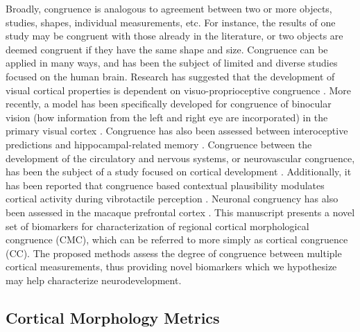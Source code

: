 \documentclass{article}
\begin{document}
Broadly, congruence is analogous to agreement between two or more
objects, studies, shapes, individual measurements, etc. For instance, the
results of one study may be congruent with those already in the literature,
or two objects are deemed congruent if they have the same shape and size.
Congruence can be applied in many ways, and has been the subject of limited
and diverse studies focused on the human brain. Research has suggested that
the development of visual cortical properties is dependent on
visuo-proprioceptive congruence \citep{buisseretChapter22Development1993}.
More recently, a model has been specifically developed for congruence of
binocular vision (how information from the left and right eye are
incorporated) in the primary visual cortex
\citep{somaratnaModelDevelopmentBinocular2022}. Congruence has also been
assessed between interoceptive predictions and hippocampal-related memory
\citep{edwards-duricCongruenceInteroceptivePredictions2020}. Congruence
between the development of the circulatory and nervous systems, or
neurovascular congruence, has been the subject of a study focused on cortical
development \citep{stubbsNeurovascularCongruenceCerebral2009}. Additionally,
it has been reported that congruence based contextual plausibility modulates
cortical activity during vibrotactile perception
\citep{kangCongruencebasedContextualPlausibility2022}. Neuronal congruency
has also been assessed in the macaque prefrontal cortex
\citep{yaoNeuronalCongruencyEffects2022}. This manuscript presents a novel
set of biomarkers for characterization of regional cortical morphological
congruence (CMC), which can be referred to more simply as cortical congruence
(CC). The proposed methods assess the degree of congruence between multiple
cortical measurements, thus providing novel biomarkers which we hypothesize
may help characterize neurodevelopment.

\subsection{Cortical Morphology Metrics}

\end{document}
